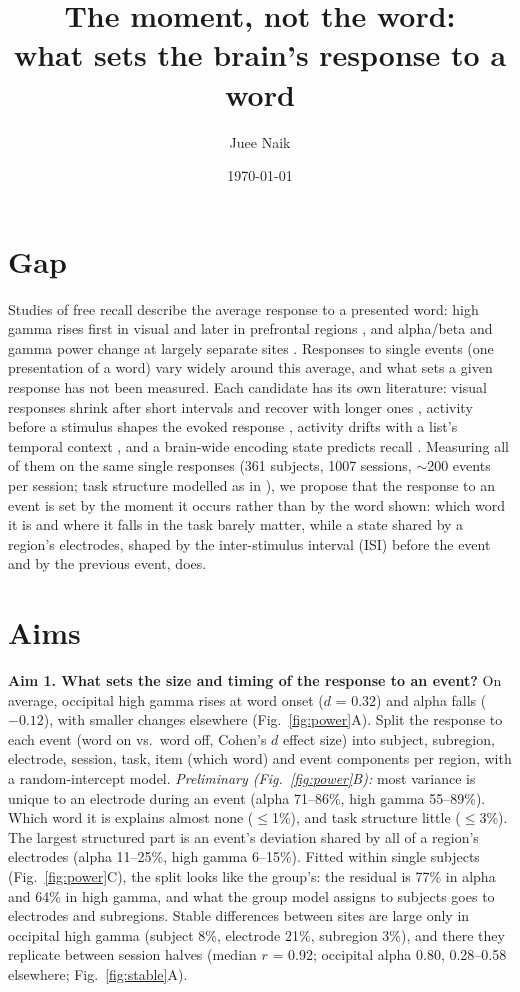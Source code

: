 \documentclass[11pt]{article}
\title{The moment, not the word:\\[2pt]\large what sets the brain's response to a word}
\author{Juee Naik}
\date{\today}
\begin{document}
\maketitle

\section*{Gap}
Studies of free recall describe the average response to a presented word: high gamma rises first in visual and later in
prefrontal regions \citep[word onset vs.\ baseline;][]{Burke_2014a,Kucewicz_2019}, and alpha/beta and gamma power
change at largely separate sites \citep{Marks_2021}. Responses to single events (one presentation of a word) vary widely around this average, and what sets
a given response has not been measured. Each candidate has its own literature: visual responses shrink after short
intervals and recover with longer ones \citep[images after a blank, ECoG;][]{Groen_2022}, activity before a stimulus
shapes the evoked response \citep[fMRI;][]{He_2013}, activity drifts with a list's temporal context \citep[recall vs.\
study patterns;][]{Manning_2011}, and a brain-wide encoding state predicts recall \citep[recalled vs.\ not recalled
words;][]{Ezzyat_2017}. Measuring all of them on the same single responses (361 subjects, 1007 sessions,
${\sim}$200 events per session; task structure modelled as in \citealp{DeHaan_2026}), we propose that the response to an
event is set by the moment it occurs rather than by the word shown: which word it is and where it falls in the task
barely matter, while a state shared by a region's electrodes, shaped by the inter-stimulus interval (ISI) before the
event and by the previous event, does.

\section*{Aims}
\textbf{Aim 1. What sets the size and timing of the response to an event?} On average, occipital high gamma rises at
word onset ($d$ = 0.32) and alpha falls ($-0.12$), with smaller changes elsewhere (Fig.~\ref{fig:power}A). Split the
response to each event (word on vs.\ word off, Cohen's $d$ effect size) into subject, subregion, electrode,
session, task, item (which word) and event components per region, with a random-intercept model. \emph{Preliminary
(Fig.~\ref{fig:power}B):} most variance is unique to an electrode during an event
(alpha 71--86\%, high gamma 55--89\%). Which word it is explains almost none ($\le$1\%), and task structure little
($\le$3\%). The largest structured part is an event's deviation shared by all of a region's electrodes (alpha
11--25\%, high gamma 6--15\%). Fitted within single subjects (Fig.~\ref{fig:power}C), the split looks like the group's: the residual is 77\%
in alpha and 64\% in high gamma, and what the group model assigns to subjects goes to electrodes and subregions.
Stable differences between sites are large only in occipital high gamma (subject 8\%, electrode 21\%, subregion
3\%), and there they replicate between session halves (median $r$ = 0.92; occipital alpha 0.80, 0.28--0.58 elsewhere;
Fig.~\ref{fig:stable}A).
\end{document}
